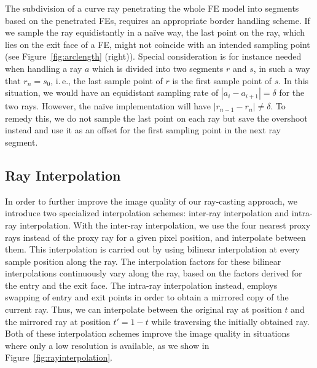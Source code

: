 \documentclass[journal]{vgtc}                %
\begin{document}
The subdivision of a curve ray penetrating the whole FE model into segments based on the penetrated FEs, requires an appropriate border handling scheme. If we sample the ray equidistantly in a na\"ive way, the last point on the ray, which lies on the exit face of a FE, might not coincide with an intended sampling point (see Figure~\ref{fig:arclength} (right)). Special consideration is for instance needed when handling a ray $a$ which is divided into two segments $r$ and $s$, in such a way that $r_n = s_0$, i.\,e., the last sample point of $r$ is the first sample point of $s$. In this situation, we would have an equidistant sampling rate of $\left|a_i - a_{i+1}\right| = \delta$ for the two rays. However, the na\"ive implementation will have $\left|r_{n-1} - r_{n}\right| \neq \delta$. To remedy this, we do not sample the last point on each ray but save the overshoot instead and use it as an offset for the first sampling point in the next ray segment.

\subsection{Ray Interpolation}

In order to further improve the image quality of our ray-casting approach, we introduce two specialized interpolation schemes: inter-ray interpolation and intra-ray interpolation. With the inter-ray interpolation, we use the four nearest proxy rays  instead of the proxy ray for a given pixel position, and interpolate between them. This interpolation is carried out by using bilinear interpolation at every sample position along the ray. The interpolation factors for these bilinear interpolations continuously vary along the ray, based on the factors derived for the entry and the exit face. The intra-ray interpolation instead, employs swapping of entry and exit points in order to obtain a mirrored copy of the current ray. Thus, we can interpolate between the original ray at position $t$ and the mirrored ray at position $t'=1-t$ while traversing the initially obtained ray. Both of these interpolation schemes improve the image quality in situations where only a low resolution is available, as we show in Figure~\ref{fig:rayinterpolation}.
\end{document}
